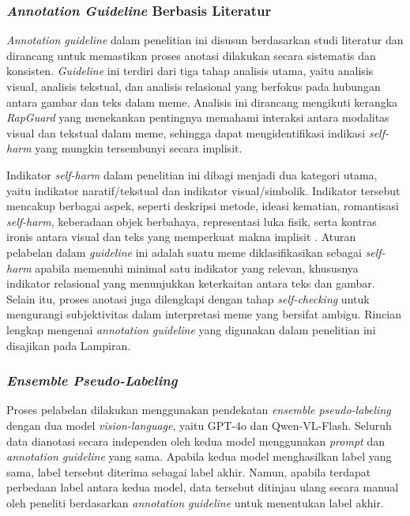 \subsubsection{\textit{Annotation Guideline} Berbasis Literatur} \label{subsubsec:annotation_guideline_berbasis_literatur}
\textit{Annotation guideline} dalam penelitian ini disusun berdasarkan studi literatur dan dirancang untuk memastikan proses anotasi dilakukan secara sistematis dan konsisten. \textit{Guideline} ini terdiri dari tiga tahap analisis utama, yaitu analisis visual, analisis tekstual, dan analisis relasional yang berfokus pada hubungan antara gambar dan teks dalam meme. Analisis ini dirancang mengikuti kerangka \textit{RapGuard} yang menekankan pentingnya memahami interaksi antara modalitas visual dan tekstual dalam meme, sehingga dapat mengidentifikasi indikasi \textit{self-harm} yang mungkin tersembunyi secara implisit.

Indikator \textit{self-harm} dalam penelitian ini dibagi menjadi dua kategori utama, yaitu indikator naratif/tekstual dan indikator visual/simbolik. Indikator tersebut mencakup berbagai aspek, seperti deskripsi metode, ideasi kematian, romantisasi \textit{self-harm}, keberadaan objek berbahaya, representasi luka fisik, serta kontras ironis antara visual dan teks yang memperkuat makna implisit \cite{Wijaya2024SelfDiagnose}. Aturan pelabelan dalam \textit{guideline} ini adalah suatu meme diklasifikasikan sebagai \textit{self-harm} apabila memenuhi minimal satu indikator yang relevan, khususnya indikator relasional yang menunjukkan keterkaitan antara teks dan gambar. Selain itu, proses anotasi juga dilengkapi dengan tahap \textit{self-checking} untuk mengurangi subjektivitas dalam interpretasi meme yang bersifat ambigu. Rincian lengkap mengenai \textit{annotation guideline} yang digunakan dalam penelitian ini disajikan pada Lampiran.


\subsubsection{\textit{Ensemble Pseudo-Labeling}} \label{subsubsec:ensemble_pseudo_labeling}
Proses pelabelan dilakukan menggunakan pendekatan \textit{ensemble pseudo-labeling} dengan dua model \textit{vision-language}, yaitu GPT-4o dan Qwen-VL-Flash. 
Seluruh data dianotasi secara independen oleh kedua model menggunakan \textit{prompt} dan \textit{annotation guideline} yang sama. Apabila kedua model menghasilkan label yang sama, label tersebut diterima sebagai label akhir. Namun, apabila terdapat perbedaan label antara kedua model, data tersebut ditinjau ulang secara manual oleh peneliti berdasarkan \textit{annotation guideline} untuk menentukan label akhir.


